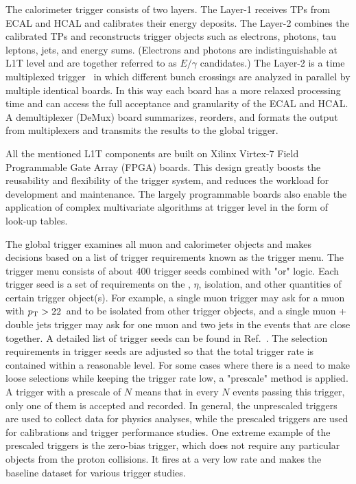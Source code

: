 The calorimeter trigger consists of two layers. 
The Layer-1 receives TPs from ECAL and HCAL and calibrates their energy deposits. 
The Layer-2 combines the calibrated TPs and reconstructs trigger objects such as electrons, photons, tau leptons, jets, and energy sums.
(Electrons and photons are indistinguishable at L1T level and are together referred to as $E/\gamma$ candidates.)
The Layer-2 is a time multiplexed trigger~\cite{Frazier_2012} in which different bunch crossings are analyzed in parallel by multiple identical boards. 
In this way each board has a more relaxed processing time and can access the full acceptance and granularity of the ECAL and HCAL.
A demultiplexer (DeMux) board summarizes, reorders, and formats the output from multiplexers and transmits the results to the global trigger.

All the mentioned L1T components are built on Xilinx Virtex-7 Field Programmable Gate Array (FPGA) boards.
This design greatly boosts the reusability and flexibility of the trigger system, and reduces the workload for development and maintenance.
The largely programmable boards also enable the application of complex multivariate algorithms at trigger level in the form of look-up tables.

The global trigger examines all muon and calorimeter objects and makes decisions based on a list of trigger requirements known as the trigger menu.
The trigger menu consists of about 400 trigger seeds combined with "or" logic.
Each trigger seed is a set of requirements on the \pt, $\eta$, isolation, and other quantities of certain trigger object(s).
For example, a single muon trigger may ask for a muon with $p_{\mathrm{T}} > 22$~\GeV and to be isolated from other trigger objects, 
and a single muon + double jets trigger may ask for one muon and two jets in the events that are close together.
A detailed list of trigger seeds can be found in Ref.~\cite{l1t_perform}.
The selection requirements in trigger seeds are adjusted so that the total trigger rate is contained within a reasonable level.
For some cases where there is a need to make loose selections while keeping the trigger rate low, a "prescale" method is applied.
A trigger with a prescale of $N$ means that in every $N$ events passing this trigger, only one of them is accepted and recorded.
In general, the unprescaled triggers are used to collect data for physics analyses, 
while the prescaled triggers are used for calibrations and trigger performance studies.
One extreme example of the prescaled triggers is the zero-bias trigger, 
which does not require any particular objects from the proton collisions.
It fires at a very low rate and makes the baseline dataset for various trigger studies.


